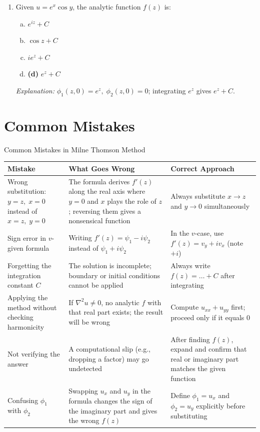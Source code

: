 \documentclass[12pt,a4paper]{article}
\begin{document}
\begin{enumerate}
  \item Given \( u = e^x \cos y \), the analytic function \( f(z) \) is:
  \begin{enumerate}[(a)]
    \item \( e^{iz} + C \)
    \item \( \cos z + C \)
    \item \( ie^z + C \)
    \item \textbf{(d)} \( e^z + C \)
  \end{enumerate}
  \textit{Explanation:} \( \phi_1(z,0) = e^z,\; \phi_2(z,0) = 0 \); integrating \( e^z \) gives \( e^z + C \).
\end{enumerate}

\section{Common Mistakes}

\begin{mistakebox}{Common Mistakes in Milne Thomson Method}
\begin{tabular}{@{}p{4.5cm}p{5.5cm}p{5cm}@{}}
\toprule
\textbf{Mistake} & \textbf{What Goes Wrong} & \textbf{Correct Approach} \\
\midrule
Wrong substitution: \( y=z,\; x=0 \) instead of \( x=z,\; y=0 \) & The formula derives \( f'(z) \) along the real axis where \( y=0 \) and \( x \) plays the role of \( z \); reversing them gives a nonsensical function & Always substitute \( x \to z \) and \( y \to 0 \) simultaneously \\
\midrule
Sign error in \( v \)-given formula & Writing \( f'(z) = \psi_1 - i\psi_2 \) instead of \( \psi_1 + i\psi_2 \) & In the \( v \)-case, use \( f'(z) = v_y + iv_x \) (note \( +i \)) \\
\midrule
Forgetting the integration constant \( C \) & The solution is incomplete; boundary or initial conditions cannot be applied & Always write \( f(z) = \ldots + C \) after integrating \\
\midrule
Applying the method without checking harmonicity & If \( \nabla^2 u \neq 0 \), no analytic \( f \) with that real part exists; the result will be wrong & Compute \( u_{xx} + u_{yy} \) first; proceed only if it equals 0 \\
\midrule
Not verifying the answer & A computational slip (e.g., dropping a factor) may go undetected & After finding \( f(z) \), expand and confirm that real or imaginary part matches the given function \\
\midrule
Confusing \( \phi_1 \) with \( \phi_2 \) & Swapping \( u_x \) and \( u_y \) in the formula changes the sign of the imaginary part and gives the wrong \( f(z) \) & Define \( \phi_1 = u_x \) and \( \phi_2 = u_y \) explicitly before substituting \\
\bottomrule
\end{tabular}
\end{mistakebox}
\end{document}
